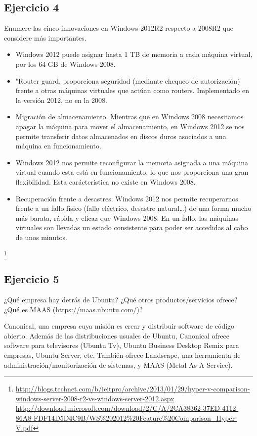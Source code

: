 \documentclass[a4paper, 11pt]{article} %
\begin{document}
\subsection*{Ejercicio 4}
Enumere las cinco innovaciones en Windows 2012R2 respecto a 2008R2
que considere más importantes.

\begin{itemize}

\item Windows 2012 puede asignar hasta 1 TB de memoria a cada máquina virtual, por los 64 GB de Windows 2008. 
\item "Router guard, proporciona seguridad (mediante chequeo de autorización) frente a otras máquinas virtuales que actúan como routers. Implementado en la versión 2012, no en la 2008. 
\item Migración de almacenamiento. Mientras que en Windows 2008 necesitamos apagar la máquina para mover el almacenamiento, en Windows 2012 se nos permite transferir datos almacenados en discos duros asociados a una máquina en funcionamiento. 
\item Windows 2012 nos permite reconfigurar la memoria asignada a una máquina virtual cuando esta está en funcionamiento, lo que nos proporciona una gran flexibilidad. Esta carácterística no existe en Windows 2008. 
\item Recuperación frente a desastres. Windows 2012 nos permite recuperarnos frente a un fallo físico (fallo eléctrico, desastre natural\dots)
de una forma mucho más barata, rápida y eficaz que Windows 2008. En un fallo, las máquinas virtuales son llevadas un estado consistente para poder ser accedidas al cabo de unos minutos. 

\end{itemize}
\footnote{\url{http://blogs.technet.com/b/ieitpro/archive/2013/01/29/hyper-v-comparison-windows-server-2008-r2-vs-windows-server-2012.aspx} \\
\url{http://download.microsoft.com/download/2/C/A/2CA38362-37ED-4112-86A8-FDF14D5D4C9B/WS\%202012\%20Feature\%20Comparison_Hyper-V.pdf}}

\subsection*{Ejercicio 5}
¿Qué empresa hay detrás de Ubuntu? ¿Qué otros productos/servicios
ofrece? ¿Qué es MAAS (\url{https://maas.ubuntu.com/})?

Canonical, una empresa cuya misión es crear y distribuir software de código abierto. Además de las distribuciones usuales de Ubuntu, Canonical ofrece software para televisores (Ubuntu Tv), Ubuntu Business Desktop Remix para empresas, Ubuntu Server, etc. También ofrece Landscape, una herramienta de administración/monitorización de sistemas, y MAAS (Metal As A Service). 
\end{document}

